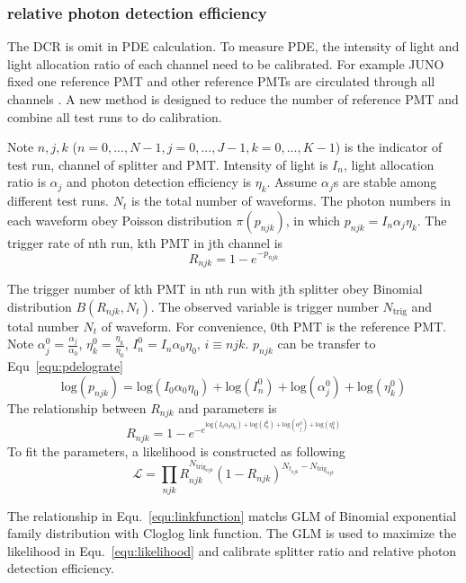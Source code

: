 \subsubsection{relative photon detection efficiency}
The DCR is omit in PDE calculation. To measure PDE, the intensity of light and light allocation ratio of each channel need to be calibrated. For example JUNO fixed one reference PMT and other reference PMTs are circulated through all channels \cite{Wonsak_2021}. A new method is designed to reduce the number of reference PMT and combine all test runs to do calibration.

Note $n,j,k$ ($n=0,...,N-1, j=0,...,J-1, k=0,...,K-1$) is the indicator of test run, channel of splitter and PMT. Intensity of light is $I_n$, light allocation ratio is $\alpha_j$ and photon detection efficiency is $\eta_k$. Assume $\alpha_j$s are stable among different test runs. $N_t$ is the total number of waveforms. The photon numbers in each waveform obey Poisson distribution $\pi(p_{njk})$, in which $p_{njk}=I_n\alpha_j\eta_k$. The trigger rate of nth run, kth PMT in jth channel is
\begin{equation}
    \label{equ:pderate}
    R_{njk}=1-e^{-p_{njk}}
\end{equation}

The trigger number of kth PMT in nth run with jth splitter obey Binomial distribution $B(R_{njk},N_t)$. The observed variable is trigger number $N_{\mathrm{trig}}$ and total number $N_{t}$ of waveform. For convenience, 0th PMT is the reference PMT. Note $\alpha_j^0=\frac{\alpha_j}{\alpha_0}$, $\eta_k^0=\frac{\eta_k}{\eta_0}$, $I_n^0=I_n\alpha_0\eta_0$, $i\equiv njk$. $p_{njk}$ can be transfer to Equ~\eqref{equ:pdelograte}
\begin{equation}
    \label{equ:pdelograte}
    \mathrm{log}(p_{njk})=\mathrm{log}(I_0\alpha_0\eta_0)+\mathrm{log}(I_n^0)+\mathrm{log}(\alpha_j^0)+\mathrm{log}(\eta_k^0)
\end{equation}
The relationship between $R_{njk}$ and parameters is
\begin{equation}
    \label{equ:linkfunction}
    R_{njk}=1-e^{-e^{\mathrm{log}(I_0\alpha_0\eta_0)+\mathrm{log}(I_n^0)+\mathrm{log}(\alpha_j^0)+\mathrm{log}(\eta_k^0)}}
\end{equation}
To fit the parameters, a likelihood is constructed as following
\begin{equation}
    \label{equ:likelihood}
    \mathcal{L}=\prod_{njk}{R_{njk}^{N_{\mathrm{trig}_{njk}}}(1-R_{njk})^{N_{t_{njk}}-N_{\mathrm{trig}_{njk}}}}
\end{equation}

The relationship in Equ.~\eqref{equ:linkfunction} matchs GLM of Binomial exponential family distribution with Cloglog link function\cite{glm}. The GLM is used to maximize the likelihood in Equ.~\eqref{equ:likelihood} and calibrate splitter ratio and relative photon detection efficiency.